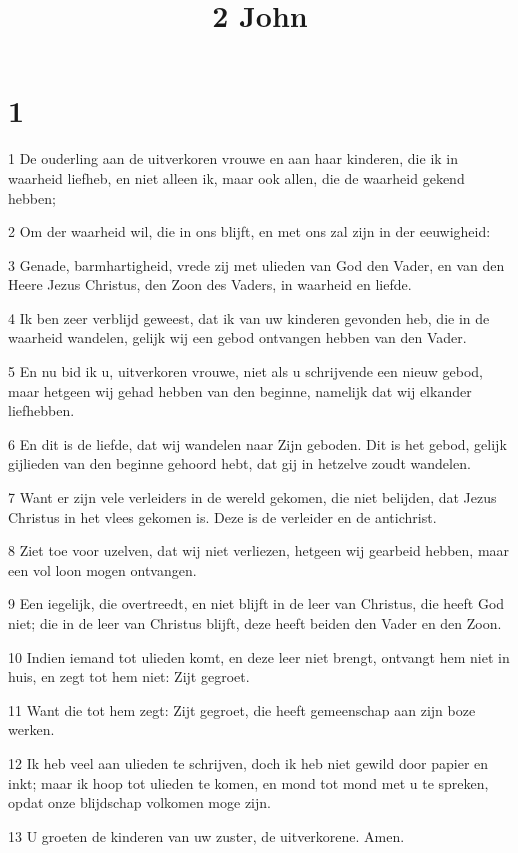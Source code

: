 

\title{2 John}



\chapter{1}

\par 1 De ouderling aan de uitverkoren vrouwe en aan haar kinderen, die ik in waarheid liefheb, en niet alleen ik, maar ook allen, die de waarheid gekend hebben;
\par 2 Om der waarheid wil, die in ons blijft, en met ons zal zijn in der eeuwigheid:
\par 3 Genade, barmhartigheid, vrede zij met ulieden van God den Vader, en van den Heere Jezus Christus, den Zoon des Vaders, in waarheid en liefde.
\par 4 Ik ben zeer verblijd geweest, dat ik van uw kinderen gevonden heb, die in de waarheid wandelen, gelijk wij een gebod ontvangen hebben van den Vader.
\par 5 En nu bid ik u, uitverkoren vrouwe, niet als u schrijvende een nieuw gebod, maar hetgeen wij gehad hebben van den beginne, namelijk dat wij elkander liefhebben.
\par 6 En dit is de liefde, dat wij wandelen naar Zijn geboden. Dit is het gebod, gelijk gijlieden van den beginne gehoord hebt, dat gij in hetzelve zoudt wandelen.
\par 7 Want er zijn vele verleiders in de wereld gekomen, die niet belijden, dat Jezus Christus in het vlees gekomen is. Deze is de verleider en de antichrist.
\par 8 Ziet toe voor uzelven, dat wij niet verliezen, hetgeen wij gearbeid hebben, maar een vol loon mogen ontvangen.
\par 9 Een iegelijk, die overtreedt, en niet blijft in de leer van Christus, die heeft God niet; die in de leer van Christus blijft, deze heeft beiden den Vader en den Zoon.
\par 10 Indien iemand tot ulieden komt, en deze leer niet brengt, ontvangt hem niet in huis, en zegt tot hem niet: Zijt gegroet.
\par 11 Want die tot hem zegt: Zijt gegroet, die heeft gemeenschap aan zijn boze werken.
\par 12 Ik heb veel aan ulieden te schrijven, doch ik heb niet gewild door papier en inkt; maar ik hoop tot ulieden te komen, en mond tot mond met u te spreken, opdat onze blijdschap volkomen moge zijn.
\par 13 U groeten de kinderen van uw zuster, de uitverkorene. Amen.




